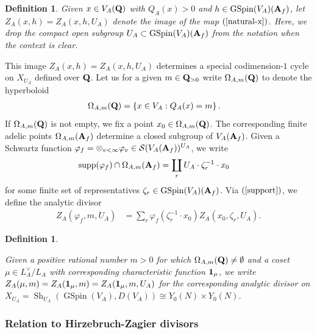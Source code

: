 \documentclass{amsart}
\newtheorem{definition}[theorem]{Definition}
\theoremstyle{definition}
\begin{document}
\begin{definition} Given $x \in V_A({\bf{Q}})$ with $Q_A(x) > 0$ and $h \in \operatorname{GSpin}(V_A)({\bf{A}}_f)$, let
$Z_A(x,h) = Z_A(x, h, U_A)$ denote the image of the map $(\ref{natural-x})$. Here, we drop the compact open subgroup 
$U_A \subset \operatorname{GSpin}(V_A)({\bf{A}}_f)$ from the notation when the context is clear. \end{definition} 

This image $Z_A(x, h) = Z_A(x, h, U_A)$ determines a special codimension-$1$ cycle on $X_{U_A}$ defined over ${\bf{Q}}$. 
Let us for a given $m \in {\bf{Q}}_{>0}$ write $\Omega_{A, m}({\bf{Q}})$ to denote the hyperboloid  
\begin{align*} \Omega_{A, m}({\bf{Q}}) &= \left\lbrace x \in V_A : Q_A(x) = m \right\rbrace. \end{align*}
If $\Omega_{A, m}({\bf{Q}})$ is not empty, we fix a point $x_0 \in \Omega_{A, m}({\bf{Q}})$.
The corresponding finite adelic points $\Omega_{A, m}({\bf{A}}_f)$ determine a closed subgroup of $V_A({\bf{A}}_f)$. 
Given a Schwartz function $\varphi_f = \otimes_{v < \infty} \varphi_v \in \mathcal{S}(V_A ({\bf{A}}_f))^{U_A}$, we write
\begin{align}\label{support} \operatorname{supp}(\varphi_f) \cap \Omega_{A, m}({\bf{A}}_f) 
&= \coprod_r U_A \cdot \zeta_r^{-1} \cdot x_0 \end{align} 
for some finite set of representatives $\zeta_r \in \operatorname{GSpin}(V_A)({\bf{A}}_f)$. 
Via $(\ref{support})$, we define the analytic divisor
\begin{align}\label{AD} Z_A(\varphi_f, m, U_A) &= \sum_r \varphi_f(\zeta_r^{-1} \cdot x_0) Z_A(x_0, \zeta_r, U_A). \end{align}

\begin{definition}\label{specialdivisor} 

Given a positive rational number $m >0$ for which $\Omega_{A, m}({\bf{Q}}) \neq \emptyset$ and a 
coset $\mu \in L^{\vee}_A/L_A$ with corresponding characteristic function ${\bf{1}}_{\mu}$, 
we write $Z_A(\mu, m) = Z_A( {\bf{1}}_{\mu}, m) = Z_A( {\bf{1}}_{\mu}, m, U_A)$ for the corresponding analytic divisor on
$X_{U_A}= \operatorname{Sh}_{U_A}(\operatorname{GSpin}(V_A), D(V_A)) \cong Y_0(N) \times Y_0(N)$. \end{definition}

\subsubsection{Relation to Hirzebruch-Zagier divisors}\label{HiZa}
\end{document}
